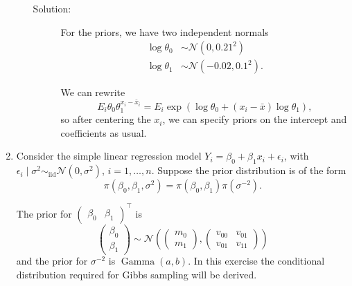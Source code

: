 \documentclass[letterpaper,11pt]{article}
\begin{document}
\begin{enumerate}
\begin{enumerate}
    \begin{description}
    \item[Solution:] For the priors, we have two independent normals
      \begin{align*}
        \log\theta_0
        &\sim \mathcal{N}\left(0, 0.21^2\right) \\
        \log\theta_1
        &\sim \mathcal{N}\left(-0.02, 0.1^2\right).
      \end{align*}

      We can rewrite
      \begin{equation}
        E_i\theta_0\theta_1^{x_i - \bar{x}_i} = E_i\exp\left(
          \log\theta_0 + \left(x_i - \bar{x}\right)\log\theta_1
        \right),
      \end{equation}
      so after centering the $x_i$, we can specify priors on the intercept and
      coefficients as usual.
    \end{description}
  \end{enumerate}
\item Consider the simple linear regression model
  $Y_i = \beta_0 + \beta_1x_i + \epsilon_i$, with
  $\epsilon_i \mid \sigma^2 \sim_\mathrm{iid} \mathcal{N}\left(0,
    \sigma^2\right)$, $i = 1,\ldots, n$. Suppose the prior distribution is of the
  form
  \begin{equation}
    \pi\left(\beta_0,\beta_1,\sigma^2\right) = \pi\left(\beta_0,\beta_1\right)
    \pi\left(\sigma^{-2}\right).
  \end{equation}

  The prior for $\begin{pmatrix}\beta_0 & \beta_1\end{pmatrix}^\intercal$ is
  \begin{equation}
    \begin{pmatrix}
      \beta_0 \\ \beta_1
    \end{pmatrix} \sim
    \mathcal{N}\left(
      \begin{pmatrix}
        m_0 \\ m_1
      \end{pmatrix},
      \begin{pmatrix}
        v_{00} & v_{01} \\ v_{01} & v_{11}
      \end{pmatrix} 
    \right)
  \end{equation}
  and the prior for $\sigma^{-2}$ is $\operatorname{Gamma}\left(a, b\right)$. In
  this exercise the conditional distribution required for Gibbs sampling will be
  derived.


\end{enumerate}
\end{document}
